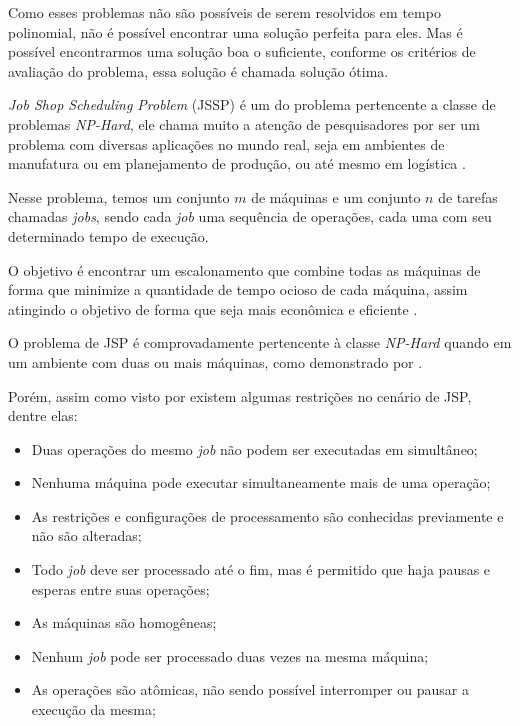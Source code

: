     Como esses problemas não são possíveis de serem resolvidos em tempo polinomial, não é possível encontrar uma solução perfeita para eles. Mas é possível encontrarmos uma solução boa o suficiente, conforme os critérios de avaliação do problema, essa solução é chamada solução ótima.\newline

    \textit{Job Shop Scheduling Problem} (JSSP) é um do problema pertencente a classe de problemas \textit{NP-Hard}, ele chama muito a atenção de pesquisadores por ser um problema com diversas aplicações no mundo real, seja em ambientes de manufatura ou em planejamento de produção, ou até mesmo em logística \cite{Cheng1996}.\newline

    Nesse problema, temos um conjunto $m$ de máquinas e um conjunto $n$ de tarefas chamadas \textit{jobs}, sendo cada \textit{job} uma sequência de operações, cada uma com seu determinado tempo de execução.\newline 

    O objetivo é encontrar um escalonamento que combine todas as máquinas de forma que minimize a quantidade de tempo ocioso de cada máquina, assim atingindo o objetivo de forma que seja mais econômica e eficiente \cite{Cheng1996}.\newline

    O problema de JSP é comprovadamente pertencente à classe \textit{NP-Hard} quando em um ambiente com duas ou mais máquinas, como demonstrado por \cite{Lenstra1979}.\newline

    Porém, assim como visto por \cite{Bagchi1999} existem algumas restrições no cenário de JSP, dentre elas:
    \begin{itemize}
        \item Duas operações do mesmo \textit{job} não podem ser executadas em simultâneo;
        \item Nenhuma máquina pode executar simultaneamente mais de uma operação;
        \item As restrições e configurações de processamento são conhecidas previamente e não são alteradas;
        \item Todo \textit{job} deve ser processado até o fim, mas é permitido que haja pausas e esperas entre suas operações;
        \item As máquinas são homogêneas;
        \item Nenhum \textit{job} pode ser processado duas vezes na mesma máquina;
        \item As operações são atômicas, não sendo possível interromper ou pausar a execução da mesma;
    \end{itemize}

